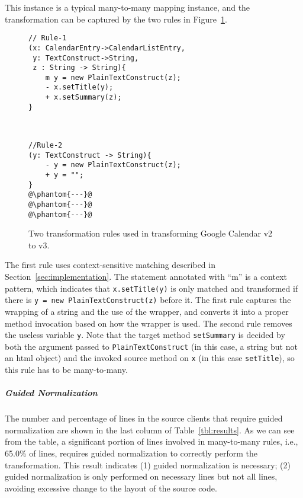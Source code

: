 \documentclass[letterpaper, USenglish]{lipics-v2016}
\newenvironment{smpage}[1]
{\begin{lrbox}{\fmbox}\begin{minipage}{#1}}
{\end{minipage}\end{lrbox}\usebox{\fmbox}}
\newcommand{\code}[1]{\texttt{\footnotesize #1}}
\theoremstyle{plain}
\begin{document}
This instance is a typical many-to-many mapping instance, and the
transformation can be captured by the two rules in Figure~\ref{evelfig:gcalendar}.

\begin{figure}
\begin{center}
\begin{smpage}{0.42\columnwidth}
\begin{lstlisting}[style=patl,frame=none,numbers=none, basicstyle=\scriptsize\ttfamily]
// Rule-1
(x: CalendarEntry->CalendarListEntry, 
 y: TextConstruct->String, 
 z : String -> String){
    m y = new PlainTextConstruct(z);
    - x.setTitle(y);
    + x.setSummary(z);
}
\end{lstlisting}
\end{smpage}
~~~
\begin{smpage}{0.4\columnwidth}
\begin{lstlisting}[style=patl,frame=none,numbers=none, basicstyle=\scriptsize\ttfamily]
//Rule-2
(y: TextConstruct -> String){
    - y = new PlainTextConstruct(z);
    + y = "";
}
@\phantom{---}@
@\phantom{---}@
@\phantom{---}@
\end{lstlisting}
\end{smpage}
\end{center}
\vspace{-20pt}
\caption{Two transformation rules used in transforming Google Calendar v2 to v3.}
\label{evelfig:gcalendar}
\vspace{-15pt}
\end{figure}

The first rule uses context-sensitive matching described in
Section~\ref{sec:implementation}. The statement annotated with ``m'' is a
context pattern, which indicates that \code{x.setTitle(y)} is only
matched and transformed if there is \code{y = new
  PlainTextConstruct(z)} before it. The first rule
captures the wrapping of a string and the use of the
wrapper, and converts it into a proper method invocation based on how
the wrapper is used. The second rule removes the useless variable
\code{y}. Note that the target method \code{setSummary} is decided by
both the argument passed to \code{PlainTextConstruct} (in this case, a
string but not an html object) and the invoked source method on
\code{x} (in this case \code{setTitle}), so this rule has to be many-to-many.

\subparagraph*{Guided Normalization}
The number and percentage of lines in the source clients that require guided normalization
are shown in the last column of Table~\ref{tbl:results}. As we can see
from the table, a significant portion of lines involved in
many-to-many rules, i.e., 65.0\% of lines, requires guided
normalization to correctly perform the transformation. This result
indicates (1) guided normalization is necessary; (2) guided
normalization is only performed on necessary lines but not all lines,
avoiding excessive change to the layout of the source code. 
\end{document}
